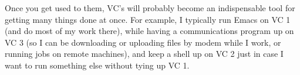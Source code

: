 
        Once you get used to them, VC's will probably become an
indispensable tool for getting many things done at once.  For example,
I typically run Emacs on VC 1 (and do most of my work there), while
having a communications program up on VC 3 (so I can be downloading or
uploading files by modem while I work, or running jobs on remote
machines), and keep a shell up on VC 2 just in case I want to run
something else without tying up VC 1.  

